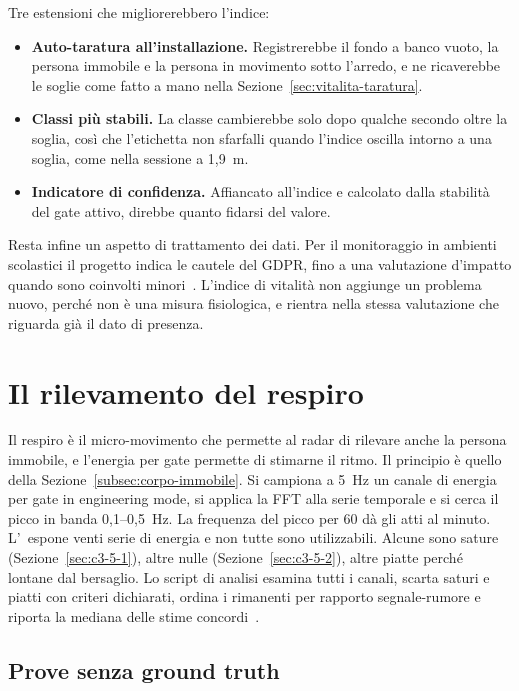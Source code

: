 Tre estensioni che migliorerebbero l'indice:

\begin{itemize}
    \item \textbf{Auto-taratura all'installazione.} Registrerebbe il fondo a banco vuoto, la persona immobile e la persona in movimento sotto l'arredo, e ne ricaverebbe le soglie come fatto a mano nella Sezione~\ref{sec:vitalita-taratura}.

    \item \textbf{Classi più stabili.} La classe cambierebbe solo dopo qualche secondo oltre la soglia, così che l'etichetta non sfarfalli quando l'indice oscilla intorno a una soglia, come nella sessione a 1,9~m.

    \item \textbf{Indicatore di confidenza.} Affiancato all'indice e calcolato dalla stabilità del gate attivo, direbbe quanto fidarsi del valore.
\end{itemize}

Resta infine un aspetto di trattamento dei dati. Per il monitoraggio in ambienti scolastici il progetto indica le cautele del GDPR, fino a una valutazione d'impatto quando sono coinvolti minori~\cite{callisto2026dipme}. L'indice di vitalità non aggiunge un problema nuovo, perché non è una misura fisiologica, e rientra nella stessa valutazione che riguarda già il dato di presenza.

\section{Il rilevamento del respiro}
\label{sec:respiro}

Il respiro è il micro-movimento che permette al radar di rilevare anche la persona immobile, e l'energia per gate permette di stimarne il ritmo. Il principio è quello della Sezione~\ref{subsec:corpo-immobile}. Si campiona
a 5~Hz un canale di energia per gate in engineering mode, si applica la FFT alla serie
temporale e si cerca il picco in banda 0,1--0,5~Hz. La frequenza del picco per 60 dà
gli atti al minuto. L'\ldb\ espone venti serie di energia e non tutte sono
utilizzabili. Alcune sono sature (Sezione~\ref{sec:c3-5-1}), altre nulle
(Sezione~\ref{sec:c3-5-2}), altre piatte perché lontane dal bersaglio. Lo script di
analisi esamina tutti i canali, scarta saturi e piatti con criteri dichiarati, ordina
i rimanenti per rapporto segnale-rumore e riporta la mediana delle stime concordi~\cite{repoTesi}.

\subsection{Prove senza ground truth}
\label{sec:respiro-senza-gt}

